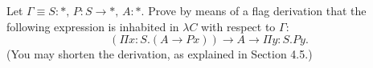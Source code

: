 \begin{problem}{6.2}
    Let $\Gamma \equiv S : *, \, P : S \rightarrow *, \, A : *$. Prove by means of a flag derivation that the following expression is inhabited in $\lambda C$ with respect to $\Gamma$:
    $$(\Pi x : S . (A \rightarrow P x)) \rightarrow A \rightarrow \Pi y : S . P y.$$
    (You may shorten the derivation, as explained in Section 4.5.)
\end{problem}